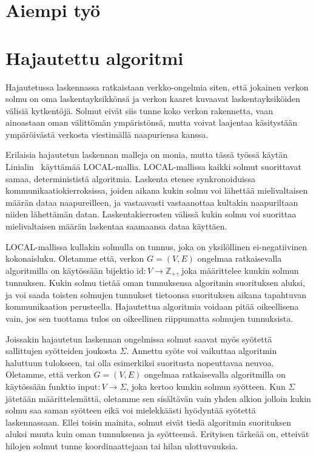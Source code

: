 \documentclass[12pt,finnish]{tktltiki2}
\theoremstyle{definition}
\theoremstyle{remark}
\begin{document}

\section{Aiempi työ}

\section{Hajautettu algoritmi}

Hajautetussa laskennassa ratkaistaan verkko-ongelmia siten, että jokainen verkon solmu on oma laskentayksikkönsä ja verkon kaaret kuvaavat laskentayksiköiden välisiä kytkentöjä. Solmut eivät siis tunne koko verkon rakennetta, vaan ainoastaan oman välittömän ympäristönsä, mutta voivat laajentaa käsitystään ympäröivästä verkosta viestimällä naapuriensa kanssa.

Erilaisia hajautetun laskennan malleja on monia, mutta tässä työssä käytän Linialin~\cite{linial92} käyttämää LOCAL-mallia. LOCAL-mallissa kaikki solmut suorittavat samaa, determinististä algoritmia. Laskenta etenee synkronoiduissa kommunikaatiokierroksissa, joiden aikana kukin solmu voi lähettää mielivaltaisen määrän dataa naapureilleen, ja vastaavasti vastaanottaa kultakin naapuriltaan niiden lähettämän datan. Laskentakierrosten välissä kukin solmu voi suorittaa mielivaltaisen määrän laskentaa saamaansa dataa käyttäen.

LOCAL-mallissa kullakin solmulla on tunnus, joka on yksilöllinen ei-negatiivinen kokonaisluku. Oletamme että, verkon $G = (V, E)$ ongelmaa ratkaisevalla algoritmilla on käytössään bijektio $\text{id}: V \rightarrow \mathbb{Z}_+$, joka määrittelee kunkin solmun tunnuksen. Kukin solmu tietää oman tunnuksensa algoritmin suorituksen aluksi, ja voi saada toisten solmujen tunnukset tietoonsa suorituksen aikana tapahtuvan kommunikaation perusteella. Hajautettua algoritmia voidaan pitää oikeellisena vain, jos sen tuottama tulos on oikeellinen riippumatta solmujen tunnuksista.

Joissakin hajautetun laskennan ongelmissa solmut saavat myös syötettä sallittujen syötteiden joukosta $\Sigma$. Annettu syöte voi vaikuttaa algoritmin haluttuun tulokseen, tai olla esimerkiksi suoritusta nopeuttavaa neuvoa. Oletamme, että verkon $G = (V, E)$ ongelmaa ratkaisevalla algoritmilla on käytössään funktio $\text{input}: V \rightarrow \Sigma$, joka kertoo kunkin solmun syötteen. Kun $\Sigma$ jätetään määrittelemättä, oletamme sen sisältävän vain yhden alkion jolloin kukin solmu saa saman syötteen eikä voi mielekkäästi hyödyntää syötettä laskennassaan. Ellei toisin mainita, solmut eivät tiedä algoritmin suorituksen aluksi muuta kuin oman tunnuksensa ja syötteensä. Erityisen tärkeää on, etteivät hilojen solmut tunne koordinaattejaan tai hilan ulottuvuuksia.
\end{document}
